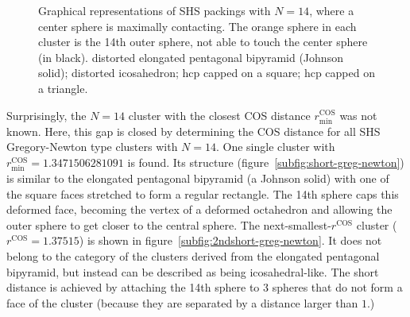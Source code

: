 \begin{figure}
    \caption{Graphical representations of \acs{SHS} packings with $N=14$, where
    a center sphere is maximally contacting. The orange sphere in each cluster
    is the 14th outer sphere, not able to touch the center sphere (in black).
    \protect{} distorted elongated pentagonal
    bipyramid (Johnson solid); \protect{}
    distorted icosahedron; \protect{} hcp capped
    on a square; \protect{} hcp capped on a
    triangle.}
    \label{fig:N14}
\end{figure}

Surprisingly, the $N = 14$ cluster with the closest \ac{COS} distance
$r_\text{min}^\text{COS}$ was not known. Here, this gap is closed by determining
the \ac{COS} distance for all \ac{SHS} Gregory-Newton type clusters with $N=14$.
One single cluster with $r_\text{min}^\text{COS}=1.3471506281091$ is found.  Its
structure (figure~\ref{subfig:short-greg-newton}) is similar to the elongated
pentagonal bipyramid (a Johnson solid) with one of the square faces stretched to
form a regular rectangle. The 14th sphere caps this deformed face, becoming the
vertex of a deformed octahedron and allowing the outer sphere to get closer to
the central sphere.  The next-smallest-$r^\text{COS}$ cluster ($r^\text{COS} =
1.37515$) is shown in figure~\ref{subfig:2ndshort-greg-newton}. It does not
belong to the category of the clusters derived from the elongated pentagonal
bipyramid, but instead can be described as being icosahedral-like.  The short
distance is achieved by attaching the 14th sphere to 3 spheres that do not form
a face of the cluster (because they are separated by a distance larger than
$1$.)

